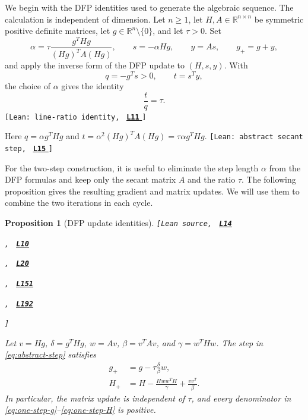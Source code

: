 \documentclass[11pt]{article}
\newtheorem{proposition}[theorem]{Proposition}
\newcommand{\R}{\mathbb R}
\newcommand{\leanLinkText}[1]{%
  \underline{\textbf{#1}}%
}
\newcommand{\leanSnapshot}{e308927f5b7930bdd002f0c0e42b9d112ad821cb}
\newcommand{\leanDeclTag}[2]{%
  {\footnotesize\texttt{[Lean source, }}%
  \href{https://github.com/imathwy/DFP_wolfe_local/blob/\leanSnapshot/#1?plain=1\#L#2}%
    {\leanLinkText{\footnotesize\texttt{L#2}}}%
}
\newcommand{\leanDeclTagExtra}[2]{%
  \unskip
  {\footnotesize\texttt{, }}%
  \href{https://github.com/imathwy/DFP_wolfe_local/blob/\leanSnapshot/#1?plain=1\#L#2}%
    {\leanLinkText{\footnotesize\texttt{L#2}}}\allowbreak
}
\newcommand{\leanDeclTagEnd}{%
  \unskip
  {\footnotesize\texttt{]}}\enspace
}
\newcommand{\leanClaimTag}[3]{%
  {\footnotesize\texttt{[Lean: #1, }}%
  \href{https://github.com/imathwy/DFP_wolfe_local/blob/\leanSnapshot/#2?plain=1\#L#3}%
    {\leanLinkText{\footnotesize\texttt{L#3}}}%
  {\footnotesize\texttt{]}}\enspace
}
\begin{document}
We begin with the DFP identities used to generate the algebraic sequence.  The
calculation is independent of dimension.  Let $n\ge1$, let
$H,A\in\R^{n\times n}$ be symmetric positive definite matrices, let
$g\in\R^n\setminus\{0\}$, and let $\tau>0$.  Set
\begin{equation}\label{eq:abstract-step}
\alpha=\tau\frac{g^THg}{(Hg)^TA(Hg)},\qquad
s=-\alpha Hg,\qquad y=As,\qquad g_+=g+y,
\end{equation}
and apply the inverse form of the DFP update to $(H,s,y)$.  With
\[
q=-g^Ts>0,\qquad t=s^Ty,
\]
the choice of $\alpha$ gives the identity
\begin{equation}\label{eq:line-ratio}
\frac tq=\tau.
\end{equation}
\leanClaimTag{line-ratio identity}{DFPWolfe/A_uniformly_convex_counterexample_to_global_convergence_of_DFP_under_weak_Wolfe_/Lemma_3_3_Exact_line_ratio_identity.lean}{11}
Here $q=\alpha g^THg$ and
$t=\alpha^2(Hg)^TA(Hg)=\tau\alpha g^THg$.
\leanClaimTag{abstract secant step}{DFPWolfe/A_uniformly_convex_counterexample_to_global_convergence_of_DFP_under_weak_Wolfe_/Definition_3_2_Abstract_secant_step_with_prescribed_line_ratio.lean}{15}

For the two-step construction, it is useful to eliminate the step length
$\alpha$ from the DFP formulas and keep only the secant matrix $A$ and the
ratio $\tau$.  The following proposition gives the resulting gradient and
matrix updates.  We will use them to combine the two iterations in each cycle.

\begin{proposition}[DFP update identities]\label{prop:one-step}
\leanDeclTag{DFPWolfe/A_uniformly_convex_counterexample_to_global_convergence_of_DFP_under_weak_Wolfe_/Proposition_3_6_Exact_one_step_gradient_map.lean}{14}
\leanDeclTagExtra{DFPWolfe/A_uniformly_convex_counterexample_to_global_convergence_of_DFP_under_weak_Wolfe_/Proposition_3_7_Exact_one_step_DFP_matrix_map.lean}{10}
\leanDeclTagExtra{DFPWolfe/A_uniformly_convex_counterexample_to_global_convergence_of_DFP_under_weak_Wolfe_/Proposition_Exact_one_step_map.lean}{20}
\leanDeclTagExtra{ReasLib/Optimization/DFP/AbstractSecantStep.lean}{151}
\leanDeclTagExtra{ReasLib/Optimization/DFP/AbstractSecantStep.lean}{192}
\leanDeclTagEnd
Let $v=Hg$, $\delta=g^THg$, $w=Av$, $\beta=v^TAv$, and
$\gamma=w^THw$.  The step in \eqref{eq:abstract-step} satisfies
\begin{align}
g_+&=g-\tau\frac{\delta}{\beta}w,
\label{eq:one-step-g}\\
H_+&=H-\frac{Hww^TH}{\gamma}+\frac{vv^T}{\beta}.
\label{eq:one-step-H}
\end{align}
In particular, the matrix update is independent of $\tau$, and every
denominator in \eqref{eq:one-step-g}--\eqref{eq:one-step-H} is positive.
\end{proposition}
\end{document}
